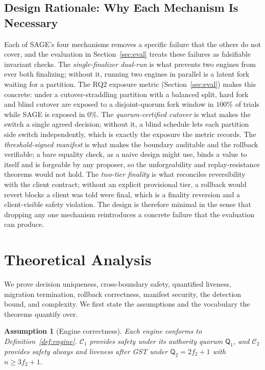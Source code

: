 \documentclass[journal]{IEEEtran}
\newtheorem{assumption}{Assumption}
\theoremstyle{remark}
\begin{document}
\subsection{Design Rationale: Why Each Mechanism Is Necessary}
Each of SAGE's four mechanisms removes a specific failure that the others do not cover, and the
evaluation in Section~\ref{sec:eval} treats these failures as falsifiable invariant checks.
The \emph{single-finalizer dual-run} is what prevents two engines from ever both finalizing;
without it, running two engines in parallel is a latent fork waiting for a partition. The RQ2
exposure metric (Section~\ref{sec:eval}) makes this concrete: under a cutover-straddling
partition with a balanced split, hard fork and blind cutover are exposed to a disjoint-quorum
fork window in $100\%$ of trials while SAGE is exposed in $0\%$. The
\emph{quorum-certified cutover} is what makes the switch a single agreed decision; without it, a
blind schedule lets each partition side switch independently, which is exactly the exposure the
metric records. The \emph{threshold-signed manifest} is what makes the boundary
auditable and the rollback verifiable; a bare equality check, as a naive design might use, binds
a value to itself and is forgeable by any proposer, so the unforgeability and replay-resistance
theorems would not hold. The \emph{two-tier finality} is what reconciles reversibility with the
client contract; without an explicit provisional tier, a rollback would revert blocks a client
was told were final, which is a finality reversion and a client-visible safety violation. The
design is therefore minimal in the sense that dropping any one mechanism reintroduces a concrete
failure that the evaluation can produce.

\section{Theoretical Analysis}
\label{sec:analysis}

We prove decision uniqueness, cross-boundary safety, quantified liveness, migration
termination, rollback correctness, manifest security, the detection bound, and complexity. We
first state the assumptions and the vocabulary the theorems quantify over.

\begin{assumption}[Engine correctness]
\label{as:engines}
Each engine conforms to Definition~\ref{def:engine}. $\mathcal{C}_1$ provides safety under its
authority quorum $\mathsf{Q}_1$, and $\mathcal{C}_2$ provides safety always and liveness after
GST under $\mathsf{Q}_2=2f_2+1$ with $n\ge 3f_2+1$.
\end{assumption}
\end{document}
